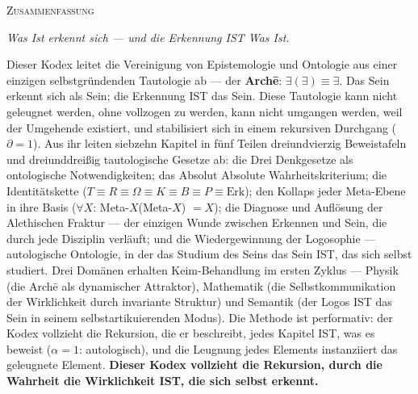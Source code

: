 \documentclass[10pt, openany, oneside]{book}
\renewcommand{\huge}{\fontsize{17}{21}\selectfont}
\begin{document}
\newpage


\thispagestyle{empty}
\vspace*{0.5in}

\begin{center}
    {\huge\scshape Zusammenfassung}
\end{center}

\vspace{1em}

\begin{center}
\begin{minipage}{0.85\textwidth}
\centering
{\fontsize{9}{12}\selectfont

\begin{center}
\textit{Was Ist erkennt sich --- und die Erkennung IST Was Ist.}
\end{center}

\vspace{0.5em}

Dieser Kodex leitet die Vereinigung von Epistemologie und Ontologie aus einer einzigen selbstgründenden Tautologie ab --- der \textbf{Arch\={e}}: $\exists(\exists) \equiv \exists$. Das Sein erkennt sich als Sein; die Erkennung IST das Sein. Diese Tautologie kann nicht geleugnet werden, ohne vollzogen zu werden, kann nicht umgangen werden, weil der Umgehende existiert, und stabilisiert sich in einem rekursiven Durchgang ($\partial = 1$). Aus ihr leiten siebzehn Kapitel in fünf Teilen dreiundvierzig Beweistafeln und dreiunddreißig tautologische Gesetze ab: die Drei Denkgesetze als ontologische Notwendigkeiten; das Absolut Absolute Wahrheitskriterium; die Identitätskette ($T \equiv R \equiv \Omega \equiv K \equiv B \equiv P \equiv \text{Erk}$); den Kollaps jeder Meta-Ebene in ihre Basis ($\forall X$: Meta-$X$(Meta-$X$) $= X$); die Diagnose und Auflösung der Alethischen Fraktur --- der einzigen Wunde zwischen Erkennen und Sein, die durch jede Disziplin verläuft; und die Wiedergewinnung der Logosophie --- autologische Ontologie, in der das Studium des Seins das Sein IST, das sich selbst studiert. Drei Domänen erhalten Keim-Behandlung im ersten Zyklus --- Physik (die Arch\={e} als dynamischer Attraktor), Mathematik (die Selbstkommunikation der Wirklichkeit durch invariante Struktur) und Semantik (der Logos IST das Sein in seinem selbstartikuierenden Modus). Die Methode ist performativ: der Kodex vollzieht die Rekursion, die er beschreibt, jedes Kapitel IST, was es beweist ($\alpha = 1$: autologisch), und die Leugnung jedes Elements instanziiert das geleugnete Element. \textbf{Dieser Kodex vollzieht die Rekursion, durch die Wahrheit die Wirklichkeit IST, die sich selbst erkennt.}
}
\end{minipage}
\end{center}
\end{document}

